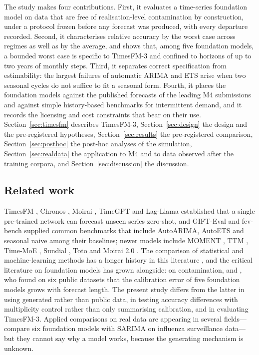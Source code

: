 \documentclass[ASNA]{USG}
\providecommand{\sectionref}[1]{Section~\ref{#1}}
\begin{document}
The study makes four contributions. First, it evaluates a time-series foundation model on data that are
free of realisation-level contamination by construction, under a protocol frozen before any forecast was
produced, with every departure recorded. Second, it characterises relative accuracy by the worst case
across regimes as well as by the average, and shows that, among five foundation models, a bounded worst
case is specific to TimesFM-3 and confined to horizons of up to two years of monthly steps. Third, it
separates correct specification from estimability: the largest failures of automatic ARIMA and ETS arise
when two seasonal cycles do not suffice to fit a seasonal form. Fourth, it places the foundation models
against the published forecasts of the leading M4 submissions and against simple history-based benchmarks
for intermittent demand, and it records the licensing and cost constraints that bear on their use.
\sectionref{sec:timesfm} describes TimesFM-3, \sectionref{sec:design} the design and the pre-registered
hypotheses, \sectionref{sec:results} the pre-registered comparison, \sectionref{sec:posthoc} the post-hoc
analyses of the simulation, \sectionref{sec:realdata} the application to M4 and to data
observed after the training corpora, and \sectionref{sec:discussion}
the discussion.

\subsection{Related work}
\label{sec:related}

TimesFM \citep{das2024timesfm}, Chronos \citep{ansari2024chronos}, Moirai \citep{woo2024moirai},
TimeGPT \citep{garza2023timegpt} and Lag-Llama \citep{rasul2023lagllama} established that a single
pre-trained network can forecast unseen series zero-shot, and GIFT-Eval \citep{aksu2024gifteval} and
fev-bench \citep{shchur2025fevbench} supplied common benchmarks that include AutoARIMA, AutoETS and
seasonal naive among their baselines; newer models include MOMENT \citep{goswami2024moment}, TTM
\citep{ekambaram2024ttm}, Time-MoE \citep{shi2024timemoe}, Sundial \citep{liu2025sundial}, Toto
\citep{cohen2025toto} and Moirai 2.0 \citep{liu2025moirai2}. The comparison of statistical and machine-learning methods has a
longer history in this literature \citep{makridakis2018statistical}, and the critical literature on
foundation models has grown alongside: \citet{meyer2025leakage} on contamination, and
\citet{adler2026calibrated}, who found on six public datasets that the calibration error of five
foundation models grows with forecast length. The present study differs from the latter in using generated
rather than public data, in testing accuracy differences with multiplicity control rather than only
summarising calibration, and in evaluating TimesFM-3. Applied comparisons on real data are appearing in
several fields---\citet{chu2026influenza} compare six foundation models with SARIMA on influenza
surveillance data---but they cannot say why a model works, because the generating mechanism is unknown.
\end{document}
